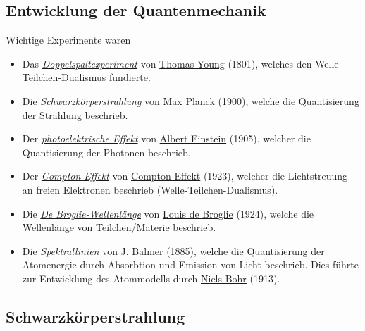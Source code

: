 \documentclass{subfiles}
\begin{document}
    \subsection{Entwicklung der Quantenmechanik}\label{Ub:EntwicklungQM}\marginnote{$\to$ \hyperref[Ub:AtomEigenschaften]{\faBook}}
        Wichtige Experimente waren
        \begin{itemize}
            \item Das \href{https://de.wikipedia.org/wiki/Doppelspaltexperiment}{\emph{Doppelspaltexperiment}} von \href{https://de.wikipedia.org/wiki/Thomas_Young}{Thomas Young} (1801), welches den Welle-Teilchen-Dualismus fundierte.
            \item Die \href{https://de.wikipedia.org/wiki/Schwarzer_Körper}{\emph{Schwarzkörperstrahlung}} von \href{https://de.wikipedia.org/wiki/Max_Planck}{Max Planck} (1900), welche die Quantisierung der Strahlung beschrieb.
            \item Der \href{https://de.wikipedia.org/wiki/Photoelektrischer_Effekt}{\emph{photoelektrische Effekt}} von \href{https://de.wikipedia.org/wiki/Albert_Einstein}{Albert Einstein} (1905), welcher die Quantisierung der Photonen beschrieb.
            \item Der \href{https://de.wikipedia.org/wiki/Compton-Effekt}{\emph{Compton-Effekt}} von \href{https://de.wikipedia.org/wiki/Compton-Effekt}{Compton-Effekt} (1923), welcher die Lichtstreuung an freien Elektronen beschrieb (Welle-Teilchen-Dualismus).
            \item Die \href{https://de.wikipedia.org/wiki/De_Broglie-Wellenl%C3%A4nge}{\emph{De Broglie-Wellenlänge}} von \href{https://de.wikipedia.org/wiki/Louis_de_Broglie}{Louis de Broglie} (1924), welche die Wellenlänge von Teilchen/Materie beschrieb.
            \item Die \href{https://de.wikipedia.org/wiki/Spektrallinie}{\emph{Spektrallinien}} von \href{https://de.wikipedia.org/wiki/Johann_Jakob_Balmer}{J. Balmer} (1885), welche die Quantisierung der Atomenergie durch Absorbtion und Emission von Licht beschrieb. Dies führte zur Entwicklung des Atommodells durch \href{https://de.wikipedia.org/wiki/Niels_Bohr}{Niels Bohr} (1913).
        \end{itemize}

        \subsection{Schwarzkörperstrahlung}\label{sec:Schwarzkoerperstrahlung}\marginnote{$\to$ \hyperref[Ub:AtomEigenschaften]{\faBook}}
\end{document}
